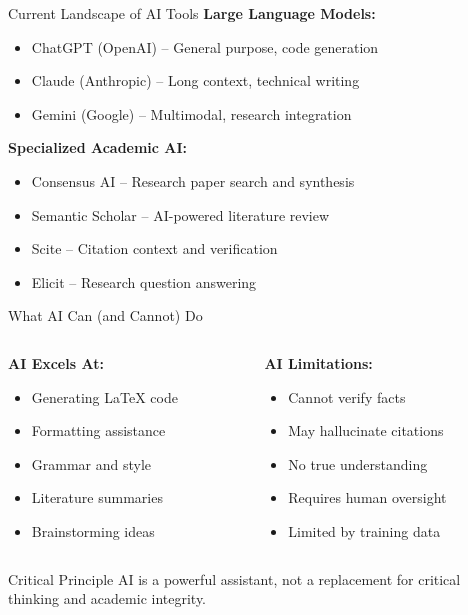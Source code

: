 \documentclass[aspectratio=169]{beamer}
\begin{document}
	\begin{frame}{Current Landscape of AI Tools}
		\textbf{Large Language Models:}
		\begin{itemize}
			\item ChatGPT (OpenAI) -- General purpose, code generation
			\item Claude (Anthropic) -- Long context, technical writing
			\item Gemini (Google) -- Multimodal, research integration
		\end{itemize}
		
		\vspace{0.5em}
		
		\textbf{Specialized Academic AI:}
		\begin{itemize}
			\item Consensus AI -- Research paper search and synthesis
			\item Semantic Scholar -- AI-powered literature review
			\item Scite -- Citation context and verification
			\item Elicit -- Research question answering
		\end{itemize}
	\end{frame}
	
	\begin{frame}{What AI Can (and Cannot) Do}
		\begin{columns}
			\begin{column}{0.48\textwidth}
				\textbf{AI Excels At:}
				\begin{itemize}
					\item Generating LaTeX code
					\item Formatting assistance
					\item Grammar and style
					\item Literature summaries
					\item Brainstorming ideas
				\end{itemize}
			\end{column}
			
			\begin{column}{0.48\textwidth}
				\textbf{AI Limitations:}
				\begin{itemize}
					\item Cannot verify facts
					\item May hallucinate citations
					\item No true understanding
					\item Requires human oversight
					\item Limited by training data
				\end{itemize}
			\end{column}
		\end{columns}
		
		\vspace{0.8em}
		
		\begin{alertblock}{Critical Principle}
			AI is a powerful assistant, not a replacement for critical thinking and academic integrity.
		\end{alertblock}
	\end{frame}
	
\end{document}
